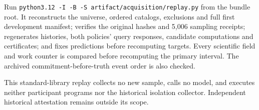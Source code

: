 Run \texttt{python3.12 -I -B -S artifact/acquisition/replay.py} from the
bundle root. It reconstructs the universe, ordered catalogs, exclusions
and full first development manifest; verifies the original hashes and
5,006 sampling receipts; regenerates histories, both policies' query
responses, candidate computations and certificates; and fixes predictions
before recomputing targets. Every scientific field and work counter is
compared before recomputing the primary interval. The archived
commitment-before-truth event order is also checked.

This standard-library replay collects no new sample, calls no model, and
executes neither participant programs nor the historical isolation collector.
Independent historical attestation remains outside its scope.
